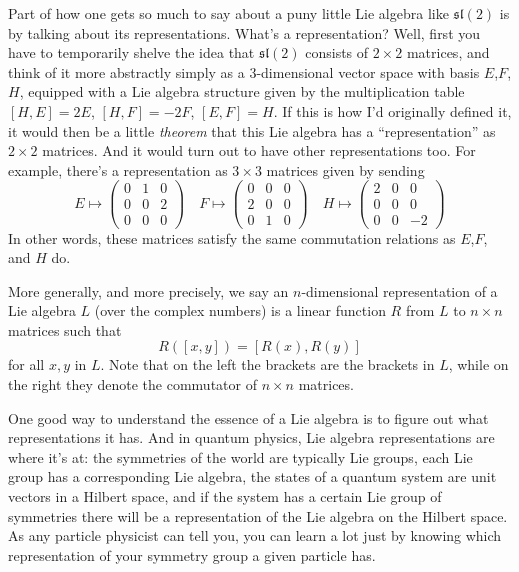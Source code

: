 \documentclass{article}
\begin{document}
Part of how one gets so much to say about a puny little Lie algebra like
\(\mathfrak{sl}(2)\) is by talking about its representations. What's a
representation? Well, first you have to temporarily shelve the idea that
\(\mathfrak{sl}(2)\) consists of \(2\times2\) matrices, and think of it
more abstractly simply as a 3-dimensional vector space with basis
\(E\),\(F\),\(H\), equipped with a Lie algebra structure given by the
multiplication table \([H,E] = 2E\), \([H,F] = -2F\), \([E,F] = H\). If
this is how I'd originally defined it, it would then be a little
\emph{theorem} that this Lie algebra has a ``representation'' as
\(2\times2\) matrices. And it would turn out to have other
representations too. For example, there's a representation as
\(3\times3\) matrices given by sending
\[E\mapsto\left(\begin{array}{ccc}0&1&0\\0&0&2\\0&0&0\end{array}\right) \quad F\mapsto\left(\begin{array}{ccc}0&0&0\\2&0&0\\0&1&0\end{array}\right) \quad H\mapsto\left(\begin{array}{ccc}2&0&0\\0&0&0\\0&0&-2\end{array}\right)\]
In other words, these matrices satisfy the same commutation relations as
\(E\),\(F\), and \(H\) do.

More generally, and more precisely, we say an \(n\)-dimensional
representation of a Lie algebra \(L\) (over the complex numbers) is a
linear function \(R\) from \(L\) to \(n\times n\) matrices such that
\[R([x,y]) = [R(x),R(y)]\] for all \(x,y\) in \(L\). Note that on the
left the brackets are the brackets in \(L\), while on the right they
denote the commutator of \(n\times n\) matrices.

One good way to understand the essence of a Lie algebra is to figure out
what representations it has. And in quantum physics, Lie algebra
representations are where it's at: the symmetries of the world are
typically Lie groups, each Lie group has a corresponding Lie algebra,
the states of a quantum system are unit vectors in a Hilbert space, and
if the system has a certain Lie group of symmetries there will be a
representation of the Lie algebra on the Hilbert space. As any particle
physicist can tell you, you can learn a lot just by knowing which
representation of your symmetry group a given particle has.
\end{document}
